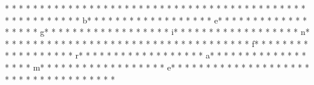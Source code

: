 * * *  * * *  * * *  *  * * *  *  * * *  * 
* * *  * * *  * * *  *  * * *  *  * * *  * %
* * *  * * *  * * *  *  * * *  *  * * *  * b* * *  * * *  * * *  *  * * *  *  * * *  * e* * *  * * *  * * *  *  * * *  *  * * *  * g* * *  * * *  * * *  *  * * *  *  * * *  * i* * *  * * *  * * *  *  * * *  *  * * *  * n* * *  * * *  * * *  *  * * *  *  * * *  * {* * *  * * *  * * *  *  * * *  *  * * *  * f* * *  * * *  * * *  *  * * *  *  * * *  * r* * *  * * *  * * *  *  * * *  *  * * *  * a* * *  * * *  * * *  *  * * *  *  * * *  * m* * *  * * *  * * *  *  * * *  *  * * *  * e* * *  * * *  * * *  *  * * *  *  * * *  * }* * *  * * *  * * *  *  * * *  *  * * *  * 
